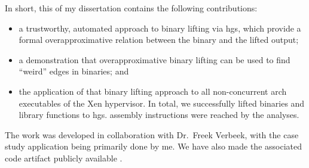 In short, this  of my dissertation contains the following contributions:
\begin{itemize}
  \item a trustworthy, automated approach to binary lifting via \acp{hg}, which provide a formal overapproximative relation between the binary and the lifted output;
  \item a demonstration that overapproximative binary lifting can be used to find ``weird'' edges in binaries; and
  \item the application of that binary lifting approach to all non-concurrent \gls{arch} executables of the Xen hypervisor.
  In total, we successfully lifted  binaries and  library functions to \acp{hg}.
  assembly instructions were reached by the analyses.
\end{itemize}
The work was developed in collaboration with Dr.~Freek Verbeek, with the case study application being primarily done by me.
We have also made the associated code artifact publicly available \autocite{bockenek2022artifact}.

